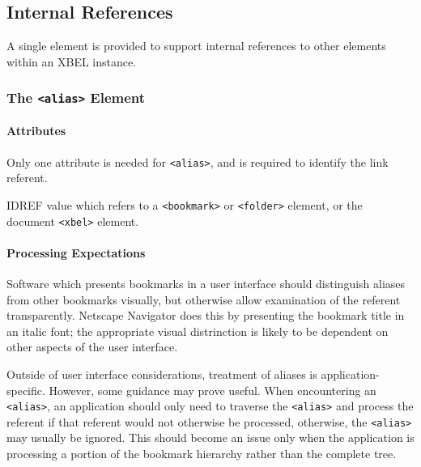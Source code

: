 \documentclass{howto}
\newcommand{\element}[1]{\texttt{<#1>}}
\newcommand{\attribute}[1]{\texttt{#1}}
\begin{document}
  \subsection{Internal References
              \label{internal-references}}

    A single element is provided to support internal references to
    other elements within an XBEL instance.

    \subsubsection{The \element{alias} Element
                   \label{element-alias}}

      \paragraph*{Attributes}
        Only one attribute is needed for \element{alias}, and is
        required to identify the link referent.

        \begin{definitions}
          \term{\attribute{ref}, \emph{required}}
          IDREF value which refers to a \element{bookmark} or
          \element{folder} element, or the document \element{xbel}
          element.
	\end{definitions}

      \paragraph*{Processing Expectations}
        Software which presents bookmarks in a user interface should
        distinguish aliases from other bookmarks visually, but
        otherwise allow examination of the referent transparently.
        Netscape Navigator does this by presenting the bookmark title
        in an italic font; the appropriate visual distrinction is
        likely to be dependent on other aspects of the user
        interface.

        Outside of user interface considerations, treatment of aliases 
        is application-specific.  However, some guidance may prove
        useful.  When encountering an \element{alias}, an application
        should only need to traverse the \element{alias} and process
        the referent if that referent would not otherwise be
        processed, otherwise, the \element{alias} may usually be
        ignored.  This should become an issue only when the
        application is processing a portion of the bookmark hierarchy
        rather than the complete tree.
\end{document}
